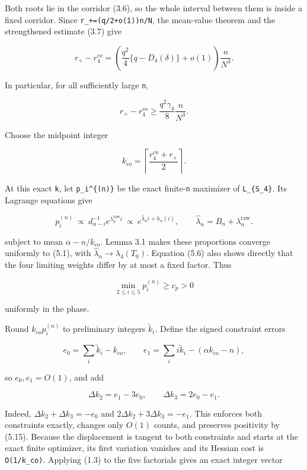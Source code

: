 \documentclass[
  11pt,
  a4paper,
]{article}
\begin{document}
Both roots lie in the corridor (3.6), so the whole interval between them
is inside a fixed corridor. Since \texttt{r\_+=(q/2+o(1))n/N}, the
mean-value theorem and the strengthened estimate (3.7) give

\[
 r_+-r_4^{co}
 =\left(\frac{q^2}{4}\{q-D_4(\delta)\}+o(1)\right)
   \frac n{N^3}.                                        \tag{5.11}
\]

In particular, for all sufficiently large \texttt{n},

\[
 r_+-r_4^{co}\ge\frac{q^2\gamma_4}{8}\frac n{N^3}.     \tag{5.12}
\]

Choose the midpoint integer

\[
 k_{co}=\left\lceil\frac{r_4^{co}+r_+}{2}\right\rceil. \tag{5.13}
\]

At this exact \texttt{k}, let \texttt{p\_i\^{}\{(n)\}} be the exact
finite-\texttt{n} maximizer of \texttt{L\_\{S\_4\}}. Its Lagrange
equations give

\[
 p_i^{(n)}\ \propto\ d_{\alpha-i}^{-1}e^{\lambda_n^{\mathrm{raw}}i}
 \ \propto\ e^{\widehat\lambda_ni+h_n(i)},\qquad
 \widehat\lambda_n=B_n+\lambda_n^{\mathrm{raw}}.          \tag{5.14}
\]

subject to mean \(\alpha-n/k_{co}\). Lemma 3.1 makes these proportions
converge uniformly to (5.1), with
\(\widehat\lambda_n\to\lambda_4(T_0)\). Equation (5.6) also shows
directly that the four limiting weights differ by at most a fixed
factor. Thus

\[
 \min_{2\le i\le5}p_i^{(n)}\ge c_p>0                    \tag{5.15}
\]

uniformly in the phase.

Round \(k_{co}p_i^{(n)}\) to preliminary integers \(\widetilde k_i\).
Define the signed constraint errors

\[
 e_0=\sum_i\widetilde k_i-k_{co},\qquad
 e_1=\sum_i i\widetilde k_i-(\alpha k_{co}-n),
\]

so \(e_0,e_1=O(1)\), and add

\[
 \Delta k_2=e_1-3e_0,\qquad
 \Delta k_3=2e_0-e_1.                                   \tag{5.16}
\]

Indeed, \(\Delta k_2+\Delta k_3=-e_0\) and
\(2\Delta k_2+3\Delta k_3=-e_1\). This enforces both constraints
exactly, changes only \(O(1)\) counts, and preserves positivity by
(5.15). Because the displacement is tangent to both constraints and
starts at the exact finite optimizer, its first variation vanishes and
its Hessian cost is \texttt{O(1/k\_co)}. Applying (1.3) to the five
factorials gives an exact integer vector
\end{document}
